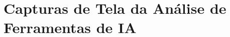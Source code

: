 \appendix
\chapter{Capturas de Tela da Análise de Ferramentas de IA}
\label{ap.telasIA}












